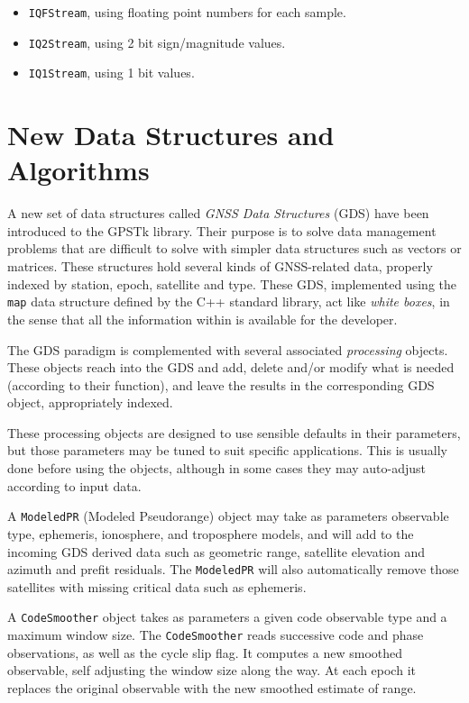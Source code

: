 \documentclass[letterpaper,ugly,10pt]{ion-gps}
\newcommand{\gpstkclass}[1]{\texttt{\mbox{#1}}}
\begin{document}
\begin{itemize}
\item \gpstkclass{IQFStream}, using floating point numbers for each sample.
\item \gpstkclass{IQ2Stream}, using 2 bit sign/magnitude values.
\item \gpstkclass{IQ1Stream}, using 1 bit values.
\end{itemize}


\section*{New Data Structures and Algorithms}

A new set of data structures called {\it GNSS Data Structures} (GDS) have been introduced to the GPSTk library. Their purpose is to solve data management problems that are difficult to solve with simpler data structures such as vectors or matrices. These structures hold several kinds of GNSS-related data, properly indexed by station, epoch, satellite and type. These GDS, implemented using the \gpstkclass{map} data structure defined by the C++ standard library, act like {\it white boxes}, in the sense that all the information within is available for the developer.

The GDS paradigm is complemented with several associated {\it processing} objects. These objects reach into the GDS and add, delete and/or modify what is needed (according to their function), and leave the results in the corresponding GDS object, appropriately indexed.

These processing objects are designed to use sensible defaults in their parameters, but those parameters may be tuned to suit specific applications. This is usually done before using the objects, although in some  cases they may auto-adjust according to input data.

A \gpstkclass{ModeledPR} (Modeled Pseudorange) object may take as parameters observable type, ephemeris, ionosphere, and troposphere models, and will add to the incoming GDS derived data such as geometric range, satellite elevation and azimuth and prefit residuals. The \gpstkclass{ModeledPR} will also automatically remove those satellites with missing critical data such as ephemeris.

A \gpstkclass{CodeSmoother} object takes as parameters a given code observable type and a maximum window size. The \gpstkclass{CodeSmoother} reads successive code and phase observations, as well as the cycle slip flag. It computes a new smoothed observable, self adjusting the window size along the way. At each epoch it replaces the original observable with the new smoothed estimate of range.
\end{document}
